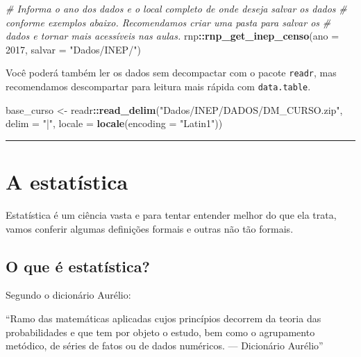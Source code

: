 \documentclass[12pt,]{style/krantz}
\makeatletter
\newenvironment{Shaded}{\begin{snugshade}}{\end{snugshade}}
\newcommand{\CommentTok}[1]{\textcolor[rgb]{0.56,0.35,0.01}{\textit{#1}}}
\newcommand{\DataTypeTok}[1]{\textcolor[rgb]{0.13,0.29,0.53}{#1}}
\newcommand{\DecValTok}[1]{\textcolor[rgb]{0.00,0.00,0.81}{#1}}
\newcommand{\KeywordTok}[1]{\textcolor[rgb]{0.13,0.29,0.53}{\textbf{#1}}}
\newcommand{\NormalTok}[1]{#1}
\newcommand{\OperatorTok}[1]{\textcolor[rgb]{0.81,0.36,0.00}{\textbf{#1}}}
\newcommand{\StringTok}[1]{\textcolor[rgb]{0.31,0.60,0.02}{#1}}
\renewenvironment{quote}{\begin{VF}}{\end{VF}}
\newenvironment{kframe}{%
\medskip{}
\setlength{\fboxsep}{.8em}
 \def\at@end@of@kframe{}%
 \ifinner\ifhmode%
  \def\at@end@of@kframe{\end{minipage}}%
  \begin{minipage}{\columnwidth}%
 \fi\fi%
 \def\FrameCommand##1{\hskip\@totalleftmargin \hskip-\fboxsep
 \colorbox{shadecolor}{##1}\hskip-\fboxsep
     \hskip-\linewidth \hskip-\@totalleftmargin \hskip\columnwidth}%
 \MakeFramed {\advance\hsize-\width
   \@totalleftmargin\z@ \linewidth\hsize
   \@setminipage}}%
 {\par\unskip\endMakeFramed%
 \at@end@of@kframe}
\renewenvironment{Shaded}{\begin{kframe}}{\end{kframe}}
\theoremstyle{definition}
\theoremstyle{definition}
\theoremstyle{definition}
\theoremstyle{remark}
\makeatother
\begin{document}
\begin{Shaded}
\begin{Highlighting}[]
\CommentTok{# Informa o ano dos dados e o local completo de onde deseja salvar os dados}
\CommentTok{# conforme exemplos abaixo. Recomendamos criar uma pasta para salvar os}
\CommentTok{# dados e tornar mais acessíveis nas aulas.}
\NormalTok{rnp}\OperatorTok{::}\KeywordTok{rnp_get_inep_censo}\NormalTok{(}\DataTypeTok{ano =} \DecValTok{2017}\NormalTok{, }\DataTypeTok{salvar =} \StringTok{"Dados/INEP/"}\NormalTok{)}
\end{Highlighting}
\end{Shaded}

Você poderá também ler os dados sem decompactar com o pacote \texttt{readr}, mas recomendamos descompartar para leitura mais rápida com \texttt{data.table}.

\begin{Shaded}
\begin{Highlighting}[]
\NormalTok{base_curso <-}\StringTok{ }\NormalTok{readr}\OperatorTok{::}\KeywordTok{read_delim}\NormalTok{(}\StringTok{"Dados/INEP/DADOS/DM_CURSO.zip"}\NormalTok{, }
                        \DataTypeTok{delim =} \StringTok{"|"}\NormalTok{, }\DataTypeTok{locale =} \KeywordTok{locale}\NormalTok{(}\DataTypeTok{encoding =} \StringTok{"Latin1"}\NormalTok{))}
\end{Highlighting}
\end{Shaded}

\begin{center}\rule{0.5\linewidth}{\linethickness}\end{center}

\mainmatter

\hypertarget{a-estatistica}{%
\chapter{A estatística}\label{a-estatistica}}

Estatística é um ciência vasta e para tentar entender melhor do que ela trata, vamos conferir algumas definições formais e outras não tão formais.

\hypertarget{o-que-e-estatistica}{%
\section{O que é estatística?}\label{o-que-e-estatistica}}

Segundo o dicionário Aurélio:

\begin{quote}
``Ramo das matemáticas aplicadas cujos princípios decorrem da teoria das probabilidades e que tem por objeto o estudo, bem como o agrupamento metódico, de séries de fatos ou de dados numéricos. --- Dicionário Aurélio''
\end{quote}
\end{document}
